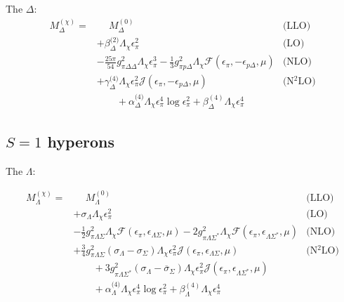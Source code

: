 \documentclass[12pt,tightenlines, raggedbottom, prd, notitlepage]{revtex4-1}
\begin{document}
The $\Delta$:
\begin{align*}
    M_\Delta^{(\chi)} = &\phantom{+}  M_\Delta^{(0)} & \text{(LLO)} \\
    &+ \beta^\text{(2)}_\Delta \Lambda_\chi \epsilon_\pi^2 & \text{(LO)} \\
    &- \frac{25\pi}{54} g_{\pi \Delta\Delta}^2 \Lambda_{\chi} \epsilon_\pi^3
    - \frac{1}{3} g_{\pi p\Delta}^2 \Lambda_{\chi} \mathcal{F}(\epsilon_\pi, -\epsilon_{p\Delta}, \mu) & \text{(NLO)} \\
    &+ \gamma_\Delta^\text{(4)} \Lambda_\chi \epsilon_\pi^2 
    \mathcal{J} (\epsilon_\pi, -\epsilon_{p \Delta}, \mu) &\text{(N$^2$LO)} \\
    &\qquad + \alpha_\Delta^\text{(4)} \Lambda_{\chi} \epsilon_\pi^4 \log{\epsilon_\pi^2} + \beta_{\Delta}^{(4)} \Lambda_\chi \epsilon_\pi^4
\end{align*}


\subsection{$S=1$ hyperons}
The $\Lambda$:

\begin{align*}
M_\Lambda^{(\chi)} = &\phantom{+}  M_\Lambda^{(0)} & \text{(LLO)} \\
&+ \sigma_\Lambda \Lambda_\chi \epsilon_\pi^2 & \text{(LO)} \\
&- \frac{1}{2} g_{\pi\Lambda\Sigma}^2 \Lambda_{\chi} \mathcal{F}(\epsilon_\pi, \epsilon_{\Lambda\Sigma}, \mu)
- 2 g_{\pi\Lambda\Sigma^*}^2 \Lambda_{\chi} \mathcal{F}(\epsilon_\pi, \epsilon_{\Lambda\Sigma^*}, \mu) & \text{(NLO)} \\
&+ \frac{3}{4} g_{\pi\Lambda\Sigma}^2 (\sigma_\Lambda - \sigma_\Sigma) \Lambda_\chi \epsilon_\pi^2 
\mathcal{J} (\epsilon_\pi, \epsilon_{\Lambda\Sigma}, \mu) &\text{(N$^2$LO)} \\
&\qquad + 3 g_{\pi\Lambda\Sigma^*}^2 (\sigma_\Lambda - \overline{\sigma}_\Sigma) \Lambda_\chi \epsilon_\pi^2  \mathcal{J} (\epsilon_\pi, \epsilon_{\Lambda\Sigma^*}, \mu) \\
&\qquad + \alpha_\Lambda^\text{(4)} \Lambda_{\chi} \epsilon_\pi^4 \log{\epsilon_\pi^2} + \beta_{\Lambda}^{(4)} \Lambda_\chi \epsilon_\pi^4
\end{align*}
\end{document}
